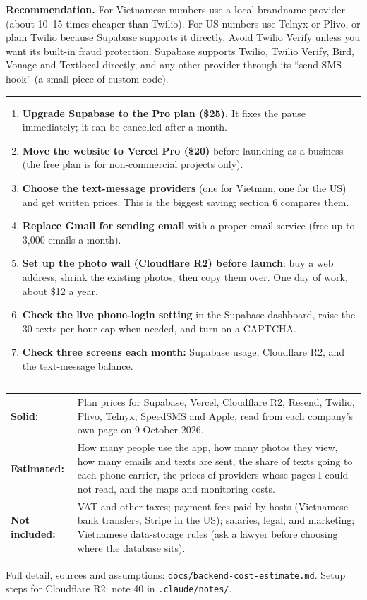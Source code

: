 \documentclass[11pt,a4paper]{article}
\newcommand{\sectionhead}[1]{\Needspace{15\baselineskip}\vspace{10pt}{\Large\bfseries #1}\par\vspace{-2pt}\textcolor{gold}{\rule{28mm}{2.2pt}}\par\vspace{4pt}}
\begin{document}
\begin{tcolorbox}[colback=sage!14,colframe=sage!14]
\textbf{Recommendation.} For Vietnamese numbers use a local brandname provider (about 10--15 times cheaper than Twilio). For US numbers use Telnyx or Plivo, or plain Twilio because Supabase supports it directly. Avoid Twilio Verify unless you want its built-in fraud protection. Supabase supports Twilio, Twilio Verify, Bird, Vonage and Textlocal directly, and any other provider through its ``send SMS hook'' (a small piece of custom code).
\end{tcolorbox}

\sectionhead{7. What to do, in order}

\begin{enumerate}[label=$\square$\;,leftmargin=8mm,itemsep=5pt]
\item \textbf{Upgrade Supabase to the Pro plan (\$25).} It fixes the pause immediately; it can be cancelled after a month.
\item \textbf{Move the website to Vercel Pro (\$20)} before launching as a business (the free plan is for non-commercial projects only).
\item \textbf{Choose the text-message providers} (one for Vietnam, one for the US) and get written prices. This is the biggest saving; section 6 compares them.
\item \textbf{Replace Gmail for sending email} with a proper email service (free up to 3,000 emails a month).
\item \textbf{Set up the photo wall (Cloudflare R2) before launch}: buy a web address, shrink the existing photos, then copy them over. One day of work, about \$12 a year.
\item \textbf{Check the live phone-login setting} in the Supabase dashboard, raise the 30-texts-per-hour cap when needed, and turn on a CAPTCHA.
\item \textbf{Check three screens each month:} Supabase usage, Cloudflare R2, and the text-message balance.
\end{enumerate}

\sectionhead{8. How sure are these numbers?}

\begin{tabular}{@{}p{30mm}p{130mm}@{}}
\textbf{Solid:} & Plan prices for Supabase, Vercel, Cloudflare R2, Resend, Twilio, Plivo, Telnyx, SpeedSMS and Apple, read from each company's own page on 9 October 2026. \\[3pt]
\textbf{Estimated:} & How many people use the app, how many photos they view, how many emails and texts are sent, the share of texts going to each phone carrier, the prices of providers whose pages I could not read, and the maps and monitoring costs. \\[3pt]
\textbf{Not included:} & VAT and other taxes; payment fees paid by hosts (Vietnamese bank transfers, Stripe in the US); salaries, legal, and marketing; Vietnamese data-storage rules (ask a lawyer before choosing where the database sits). \\
\end{tabular}

\vspace{8pt}
{\small\color{mute} Full detail, sources and assumptions: \texttt{docs/backend-cost-estimate.md}. Setup steps for Cloudflare R2: note 40 in \texttt{.claude/notes/}.}
\end{document}
